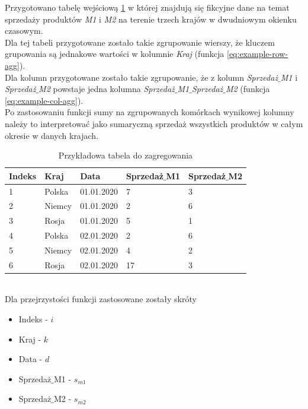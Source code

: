 \documentclass[brudnopis]{xmgr}
\begin{document}
Przygotowano tabelę wejściową \ref{tab:example-input} w której znajdują się fikcyjne dane na temat sprzedaży produktów \emph{M1} i \emph{M2} na terenie trzech krajów w dwudniowym okienku czasowym.
\medskip\\

Dla tej tabeli przygotowane zostało takie zgrupowanie wierszy, że kluczem grupowania są jednakowe wartości w kolumnie \emph{Kraj} (funkcja \ref{eq:example-row-agg}).
\medskip\\

Dla kolumn przygotowane zostało takie zgrupowanie, że z kolumn \emph{Sprzedaż$\_$M1} i \emph{Sprzedaż$\_$M2} powstaje jedna kolumna \emph{Sprzedaż$\_$M1$\_$Sprzedaż$\_$M2} (funkcja \ref{eq:example-col-agg}).
\medskip\\

Po zastosowaniu funkcji sumy na zgrupowanych komórkach wynikowej kolumny należy to interpretować jako sumaryczną sprzedaż wszystkich produktów w całym okresie w danych krajach.

\begin{table}[!tbh]
\begin{tabular}{|l|l|l|l|l|} \hline
Indeks & Kraj & Data & Sprzedaż$\_$M1 & Sprzedaż$\_$M2 \\ \hline
1 & Polska & 01.01.2020 & 7 & 3 \\ \hline
2 & Niemcy & 01.01.2020 & 2 & 6 \\ \hline
3 & Rosja & 01.01.2020 & 5 & 1 \\ \hline
4 & Polska & 02.01.2020 & 2 & 6 \\ \hline
5 & Niemcy & 02.01.2020 & 4 & 2 \\ \hline
6 & Rosja & 02.01.2020 & 17 & 3 \\ \hline
\end{tabular}
\caption{Przykładowa tabela do zagregowania \label{tab:example-input}}
\end{table}
\medskip\\

Dla przejrzystości funkcji zastosowane zostały skróty
\medskip\\

\begin{itemize}
    \item Indeks - $i$
    \item Kraj - $k$
    \item Data - $d$
    \item Sprzedaż$\_$M1 - $s_{m1}$
    \item Sprzedaż$\_$M2 - $s_{m2}$
\end{itemize}
\medskip\\
\end{document}
